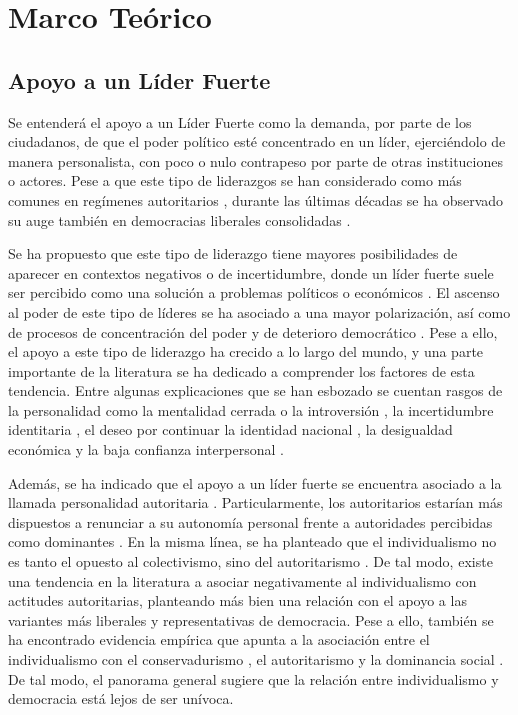 \documentclass[12pt,oneside]{templates/facsothesis}
\begin{document}
\hypertarget{marco-teuxf3rico}{%
\chapter*{Marco Teórico}\label{marco-teuxf3rico}}

\hypertarget{apoyo-a-un-luxedder-fuerte}{%
\section*{Apoyo a un Líder Fuerte}\label{apoyo-a-un-luxedder-fuerte}}

Se entenderá el apoyo a un Líder Fuerte como la demanda, por parte de los ciudadanos, de que el poder político esté concentrado en un líder, ejerciéndolo de manera personalista, con poco o nulo contrapeso por parte de otras instituciones o actores. Pese a que este tipo de liderazgos se han considerado como más comunes en regímenes autoritarios \citep{kendall-taylor2017}, durante las últimas décadas se ha observado su auge también en democracias liberales consolidadas \citep{lindstaedt2021, kendall-taylor2017}.

Se ha propuesto que este tipo de liderazgo tiene mayores posibilidades de aparecer en contextos negativos o de incertidumbre, donde un líder fuerte suele ser percibido como una solución a problemas políticos o económicos \citep{harms2018}. El ascenso al poder de este tipo de líderes se ha asociado a una mayor polarización, así como de procesos de concentración del poder y de deterioro democrático \citep{lindstaedt2021, brunkert2023, kendall-taylor2017}. Pese a ello, el apoyo a este tipo de liderazgo ha crecido a lo largo del mundo, y una parte importante de la literatura se ha dedicado a comprender los factores de esta tendencia. Entre algunas explicaciones que se han esbozado se cuentan rasgos de la personalidad como la mentalidad cerrada o la introversión \citep{armendarizmiranda2021}, la incertidumbre identitaria \citep{hogg2021, hogg2013}, el deseo por continuar la identidad nacional \citep{selvanathan2022}, la desigualdad económica \citep{sprong2019} y la baja confianza interpersonal \citep{xuereb2021}.

Además, se ha indicado que el apoyo a un líder fuerte se encuentra asociado a la llamada personalidad autoritaria \citep{harms2018}. Particularmente, los autoritarios estarían más dispuestos a renunciar a su autonomía personal frente a autoridades percibidas como dominantes \citep{harms2018}. En la misma línea, se ha planteado que el individualismo no es tanto el opuesto al colectivismo, sino del autoritarismo \citep{gelfand1996}. De tal modo, existe una tendencia en la literatura a asociar negativamente al individualismo con actitudes autoritarias, planteando más bien una relación con el apoyo a las variantes más liberales y representativas de democracia. Pese a ello, también se ha encontrado evidencia empírica que apunta a la asociación entre el individualismo con el conservadurismo \citep{zhang2009}, el autoritarismo \citep{kemmelmeier2003} y la dominancia social \citep{strunk1999}. De tal modo, el panorama general sugiere que la relación entre individualismo y democracia está lejos de ser unívoca.
\end{document}
